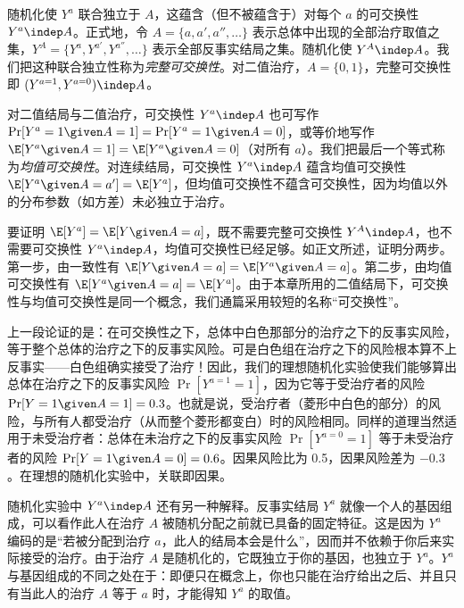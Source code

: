 \renewcommand{\TPname}{技术注记（Technical Point）}
\begin{techpoint}[完整可交换性与均值可交换性]
随机化使 $Y^{a}$ 联合独立于 $A$，这蕴含（但不被蕴含于）对每个 $a$ 的可交换性 $Y^{a}\indep A$。正式地，令 $A=\{a,a',a'',\dots\}$ 表示总体中出现的全部治疗取值之集，$Y^{A}=\{Y^{a},Y^{a'},Y^{a''},\dots\}$ 表示全部反事实结局之集。随机化使 $Y^{A}\indep A$。我们把这种联合独立性称为\emph{完整可交换性}。对二值治疗，$A=\{0,1\}$，完整可交换性即 $(Y^{a=1},Y^{a=0})\indep A$。

对二值结局与二值治疗，可交换性 $Y^{a}\indep A$ 也可写作 $\Pr[Y^{a}=1\given A=1]=\Pr[Y^{a}=1\given A=0]$，或等价地写作 $\E[Y^{a}\given A=1]=\E[Y^{a}\given A=0]$（对所有 $a$）。我们把最后一个等式称为\emph{均值可交换性}。对连续结局，可交换性 $Y^{a}\indep A$ 蕴含均值可交换性 $\E[Y^{a}\given A=a']=\E[Y^{a}]$，但均值可交换性不蕴含可交换性，因为均值以外的分布参数（如方差）未必独立于治疗。

要证明 $\E[Y^{a}]=\E[Y\given A=a]$，既不需要完整可交换性 $Y^{A}\indep A$，也不需要可交换性 $Y^{a}\indep A$，均值可交换性已经足够。如正文所述，证明分两步。第一步，由一致性有 $\E[Y\given A=a]=\E[Y^{a}\given A=a]$。第二步，由均值可交换性有 $\E[Y^{a}\given A=a]=\E[Y^{a}]$。由于本章所用的二值结局下，可交换性与均值可交换性是同一个概念，我们通篇采用较短的名称“可交换性”。
\end{techpoint}
\renewcommand{\TPname}{技术注记}

上一段论证的是：在可交换性之下，总体中白色那部分的治疗之下的反事实风险，等于整个总体的治疗之下的反事实风险。可是白色组在治疗之下的风险根本算不上反事实——白色组确实接受了治疗！因此，我们的理想随机化实验使我们能够算出总体在治疗之下的反事实风险 $\Pr[Y^{a=1}=1]$，因为它等于受治疗者的风险 $\Pr[Y=1\given A=1]=0.3$。也就是说，受治疗者（菱形中白色的部分）的风险，与所有人都受治疗（从而整个菱形都变白）时的风险相同。同样的道理当然适用于未受治疗者：总体在未治疗之下的反事实风险 $\Pr[Y^{a=0}=1]$ 等于未受治疗者的风险 $\Pr[Y=1\given A=0]=0.6$。因果风险比为 0.5，因果风险差为 $-0.3$。在理想的随机化实验中，关联即因果。

随机化实验中 $Y^{a}\indep A$ 还有另一种解释。反事实结局 $Y^{a}$ 就像一个人的基因组成，可以看作此人在治疗 $A$ 被随机分配之前就已具备的固定特征。这是因为 $Y^{a}$ 编码的是“若被分配到治疗 $a$，此人的结局本会是什么”，因而并不依赖于你后来实际接受的治疗。由于治疗 $A$ 是随机化的，它既独立于你的基因，也独立于 $Y^{a}$。$Y^{a}$ 与基因组成的不同之处在于：即便只在概念上，你也只能在治疗给出之后、并且只有当此人的治疗 $A$ 等于 $a$ 时，才能得知 $Y^{a}$ 的取值。

